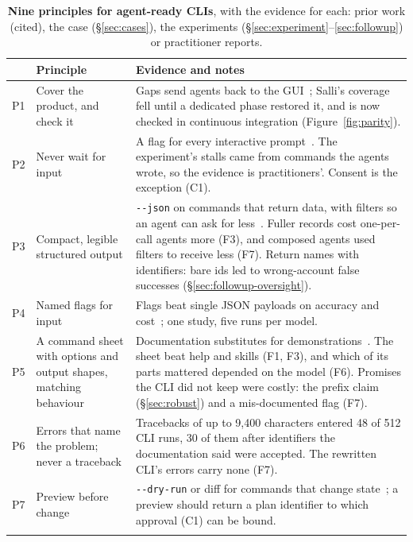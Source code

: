 \documentclass[sigconf,nonacm]{acmart}
\newcommand{\sysA}{Salli}
\newcommand{\flag}[1]{\texttt{-\/-#1}}
\begin{document}
\begin{table}[t]
\caption{\textbf{Nine principles for agent-ready CLIs}, with the evidence for each: prior work (cited), the case (\S\ref{sec:cases}), the experiments (\S\ref{sec:experiment}--\ref{sec:followup}) or practitioner reports.}
\label{tab:principles}
\small
\begin{tabularx}{\textwidth}{@{}l>{\raggedright\arraybackslash}p{3.9cm}X@{}}
\toprule
 & \textbf{Principle} & \textbf{Evidence and notes} \\
\midrule
P1 & Cover the product, and check it & Gaps send agents back to the GUI~\cite{zhou2026guicli}; \sysA{}'s coverage fell until a dedicated phase restored it, and is now checked in continuous integration (Figure~\ref{fig:parity}). \\ \addlinespace
P2 & Never wait for input & A flag for every interactive prompt~\cite{mistral2026spaces}. The experiment's stalls came from commands the agents wrote, so the evidence is practitioners'. Consent is the exception (C1). \\ \addlinespace
P3 & Compact, legible structured output & \flag{json} on commands that return data, with filters so an agent can ask for less~\cite{anthropic2025writingtools}. Fuller records cost one-per-call agents more (F3), and composed agents used filters to receive less (F7). Return names with identifiers: bare ids led to wrong-account false successes (\S\ref{sec:followup-oversight}). \\ \addlinespace
P4 & Named flags for input & Flags beat single JSON payloads on accuracy and cost~\cite{mastykarz2026dont}; one study, five runs per model. \\ \addlinespace
P5 & A command sheet with options and output shapes, matching behaviour & Documentation substitutes for demonstrations~\cite{hsieh2023tooldoc}. The sheet beat help and skills (F1, F3), and which of its parts mattered depended on the model (F6). Promises the CLI did not keep were costly: the prefix claim (\S\ref{sec:robust}) and a mis-documented flag (F7). \\ \addlinespace
P6 & Errors that name the problem; never a traceback & Tracebacks of up to 9{,}400 characters entered 48 of 512 CLI runs, 30 of them after identifiers the documentation said were accepted. The rewritten CLI's errors carry none (F7). \\ \addlinespace
P7 & Preview before change & \flag{dry-run} or diff for commands that change state~\cite{clig2020}; a preview should return a plan identifier to which approval (C1) can be bound. \\ \addlinespace

\end{tabularx}
\end{table}
\end{document}
